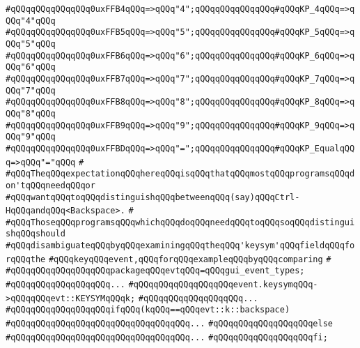 \verb|#qQQqqQQqqQQqqQQq0uxFFB4qQQq=>qQQq"4";qQQqqQQqqQQqqQQq#qQQqKP_4qQQq=>qQQq"4"qQQq|\newline
\verb|#qQQqqQQqqQQqqQQq0uxFFB5qQQq=>qQQq"5";qQQqqQQqqQQqqQQq#qQQqKP_5qQQq=>qQQq"5"qQQq|\newline
\verb|#qQQqqQQqqQQqqQQq0uxFFB6qQQq=>qQQq"6";qQQqqQQqqQQqqQQq#qQQqKP_6qQQq=>qQQq"6"qQQq|\newline
\verb|#qQQqqQQqqQQqqQQq0uxFFB7qQQq=>qQQq"7";qQQqqQQqqQQqqQQq#qQQqKP_7qQQq=>qQQq"7"qQQq|\newline
\verb|#qQQqqQQqqQQqqQQq0uxFFB8qQQq=>qQQq"8";qQQqqQQqqQQqqQQq#qQQqKP_8qQQq=>qQQq"8"qQQq|\newline
\verb|#qQQqqQQqqQQqqQQq0uxFFB9qQQq=>qQQq"9";qQQqqQQqqQQqqQQq#qQQqKP_9qQQq=>qQQq"9"qQQq|\newline
\verb|#qQQqqQQqqQQqqQQq0uxFFBDqQQq=>qQQq"=";qQQqqQQqqQQqqQQq#qQQqKP_EqualqQQq=>qQQq"="qQQq|\newline
\verb|#|\newline
\verb|#qQQqTheqQQqexpectationqQQqhereqQQqisqQQqthatqQQqmostqQQqprogramsqQQqdon'tqQQqneedqQQqor|\newline
\verb|#qQQqwantqQQqtoqQQqdistinguishqQQqbetweenqQQq(say)qQQqCtrl-HqQQqandqQQq<Backspace>.|\newline
\verb|#|\newline
\verb|#qQQqThoseqQQqprogramsqQQqwhichqQQqdoqQQqneedqQQqtoqQQqsoqQQqdistinguishqQQqshould|\newline
\verb|#qQQqdisambiguateqQQqbyqQQqexaminingqQQqtheqQQq'keysym'qQQqfieldqQQqforqQQqthe|\newline
\verb|#qQQqkeyqQQqevent,qQQqforqQQqexampleqQQqbyqQQqcomparing|\newline
\verb|#|\newline
\verb|#qQQqqQQqqQQqqQQqqQQqpackageqQQqevtqQQq=qQQqgui_event_types;|\newline
\verb|#qQQqqQQqqQQqqQQqqQQq...|\newline
\verb|#qQQqqQQqqQQqqQQqqQQqevent.keysymqQQq->qQQqqQQqevt::KEYSYMqQQqk;|\newline
\verb|#qQQqqQQqqQQqqQQqqQQq...|\newline
\verb|#qQQqqQQqqQQqqQQqqQQqifqQQq(kqQQq==qQQqevt::k::backspace)|\newline
\verb|#qQQqqQQqqQQqqQQqqQQqqQQqqQQqqQQqqQQq...|\newline
\verb|#qQQqqQQqqQQqqQQqqQQqelse|\newline
\verb|#qQQqqQQqqQQqqQQqqQQqqQQqqQQqqQQqqQQq...|\newline
\verb|#qQQqqQQqqQQqqQQqqQQqfi;|\newline

